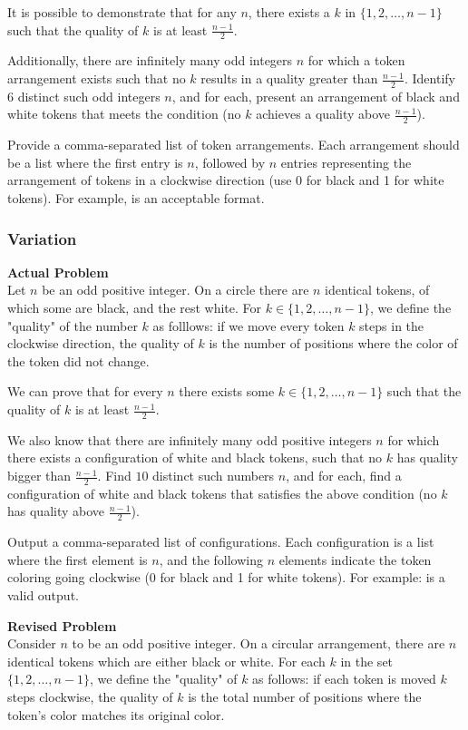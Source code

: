 It is possible to demonstrate that for any $n$, there exists a $k$ in $\{1, 2, \ldots, n-1\}$ such that the quality of $k$ is at least $\frac{n-1}{2}$. 

Additionally, there are infinitely many odd integers $n$ for which a token arrangement exists such that no $k$ results in a quality greater than $\frac{n-1}{2}$. Identify $6$ distinct such odd integers $n$, and for each, present an arrangement of black and white tokens that meets the condition (no $k$ achieves a quality above $\frac{n-1}{2}$).

Provide a comma-separated list of token arrangements. Each arrangement should be a list where the first entry is $n$, followed by $n$ entries representing the arrangement of tokens in a clockwise direction (use 0 for black and 1 for white tokens). For example,  is an acceptable format.

\subsubsection{Variation}
\textbf{Actual Problem}\\
Let $n$ be an odd positive integer. On a circle there are $n$ identical tokens, of which some are black, and the rest white. For $k \in \{1, 2, \ldots, n-1\}$, we define the "quality" of the number $k$ as folllows: if we move every token $k$ steps in the clockwise direction, the quality of $k$ is the number of positions where the color of the token did not change. 

We can prove that for every $n$ there exists some $k \in \{1, 2, \ldots, n-1\}$ such that the quality of $k$ is at least $\frac{n-1}{2}$.

We also know that there are infinitely many odd positive integers $n$ for which there exists a configuration of white and black tokens, such that no $k$ has quality bigger than $\frac{n-1}{2}$.
Find $10$ distinct such numbers $n$, and for each, find a configuration of white and black tokens that satisfies the above condition (no $k$ has quality above $\frac{n-1}{2}$).


Output a comma-separated list of configurations. Each configuration is a list where the first element is $n$, and the following $n$ elements indicate the token coloring going clockwise (0 for black and 1 for white tokens). For example:  is a valid output.

\textbf{Revised Problem}\\
Consider \( n \) to be an odd positive integer. On a circular arrangement, there are \( n \) identical tokens which are either black or white. For each \( k \) in the set \(\{1, 2, \ldots, n-1\}\), we define the "quality" of \( k \) as follows: if each token is moved \( k \) steps clockwise, the quality of \( k \) is the total number of positions where the token's color matches its original color.

